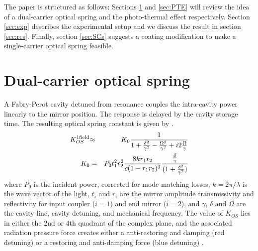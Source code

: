 

The paper is structured as follows: Sections \ref{sec:DCOS} and \ref{sec:PTE} will review the idea of a dual-carrier optical spring and the photo-thermal effect respectively. 
Section \ref{sec:exp} describes the experimental setup and we discuss the result in section \ref{sec:res}. Finally, section \ref{sec:SCs} suggests a coating modification to make a single-carrier optical spring feasible.


\section{Dual-carrier optical spring}
\label{sec:DCOS}
A Fabry-Perot cavity detuned from resonance couples the intra-cavity power linearly to the mirror position. The response is delayed by the cavity storage time. The resulting optical spring constant is given by \cite{Perreca14}.
\begin{eqnarray}
\label{eq:KOS1}
K_{OS}^{\rm 1 field} & {\approx} & K_0
\frac{1}{1+\frac{\delta^2}{\gamma^2}-\frac{\Omega^2}{\gamma^2}+i2\frac{\Omega}{\gamma} } \\
K_0 &= & P_0 t_1^2 r_2^2 \frac{8k r_1r_2}{c(1-r_1r_2)^3}\frac{ \frac{\delta}{\gamma}}{(1+\frac{\delta^2}{\gamma^2})} 
\end{eqnarray}
where $P_0$ is the incident power, corrected for mode-matching losses, $k = {2\pi}/{\lambda}$ is the wave vector of the light, $t_i$ and $r_i$ are the mirror amplitude transmissivity and reflectivity for input coupler ($i=1$) and end mirror ($i=2$), and $\gamma$, $\delta$ and $\Omega$ are the cavity line, cavity detuning, and mechanical frequency. The value of $K_{OS}$ lies in either the 2nd or 4th quadrant of the complex plane, and the associated radiation pressure force creates either
a anti-restoring and damping (red detuning) or
a restoring and anti-damping force (blue detuning) \cite{Sheard04}. 

